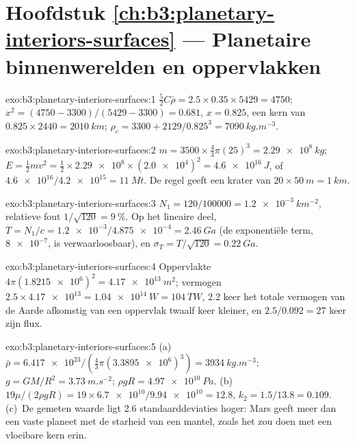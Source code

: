 \section*{Hoofdstuk \ref{ch:b3:planetary-interiors-surfaces} --- Planetaire binnenwerelden en oppervlakken}

\begin{solution}{exo:b3:planetary-interiors-surfaces:1}
$\tfrac52C\bar\rho = 2.5\times0.35\times5429 = 4750$; $x^2 = (4750 -
3300)/(5429 - 3300) = 0.681$, $x = 0.825$, een kern van $0.825\times2440 =
\qty{2010}{km}$; $\rho_c = 3300 + 2129/0.825^3 = \qty{7090}{kg.m^{-3}}$.
\end{solution}

\begin{solution}{exo:b3:planetary-interiors-surfaces:2}
$m = 3500\times\tfrac43\pi(25)^3 = \qty{2.29e8}{kg}$; $E = \tfrac12 m v^2 =
\tfrac12\times\num{2.29e8}\times(\num{2.0e4})^2 = \qty{4.6e16}{J}$, of
$\num{4.6e16}/\num{4.2e15} = \qty{11}{Mt}$. De regel geeft een krater van
$20\times\qty{50}{m} = \qty{1}{km}$.
\end{solution}

\begin{solution}{exo:b3:planetary-interiors-surfaces:3}
$N_1 = 120/\num{100000} = \qty{1.2e-3}{km^{-2}}$, relatieve fout $1/\sqrt{120}
= \qty{9}{\percent}$. Op het lineaire deel, $T = N_1/c = \num{1.2e-3}/\num{4.875e-4}
= \qty{2.46}{Ga}$ (de exponentiële term, $\num{8e-7}$, is verwaarloosbaar), en
$\sigma_T = T/\sqrt{120} = \qty{0.22}{Ga}$.
\end{solution}

\begin{solution}{exo:b3:planetary-interiors-surfaces:4}
Oppervlakte $4\pi(\num{1.8215e6})^2 = \qty{4.17e13}{m^2}$; vermogen $2.5\times
\num{4.17e13} = \qty{1.04e14}{W} = \qty{104}{TW}$, 2.2 keer het totale vermogen van de Aarde
afkomstig van een oppervlak twaalf keer kleiner, en $2.5/0.092 = 27$ keer zijn
flux.
\end{solution}

\begin{solution}{exo:b3:planetary-interiors-surfaces:5}
(a)~$\bar\rho = \num{6.417e23}/(\tfrac43\pi(\num{3.3895e6})^3) =
\qty{3934}{kg.m^{-3}}$; $g = GM/R^2 = \qty{3.73}{m.s^{-2}}$; $\rho gR =
\qty{4.97e10}{Pa}$. (b)~$19\mu/(2\rho gR) = 19\times\num{6.7e10}/\num{9.94e10}
= 12.8$, $k_2 = 1.5/13.8 = 0.109$. (c)~De gemeten waarde ligt
2.6 standaarddeviaties hoger: Mars geeft meer dan een vaste planeet met
de starheid van een mantel, zoals het zou doen met een vloeibare kern erin.
\end{solution}


